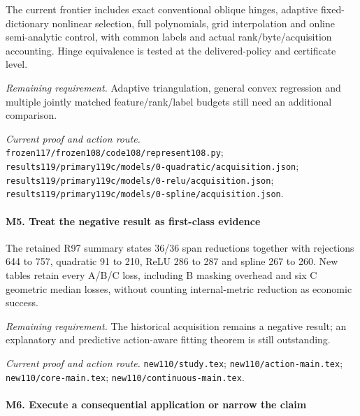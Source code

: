The current frontier includes exact conventional oblique hinges, adaptive fixed-dictionary nonlinear selection, full polynomials, grid interpolation and online semi-analytic control, with common labels and actual rank/\allowbreak{}byte/\allowbreak{}acquisition accounting. Hinge equivalence is tested at the delivered-policy and certificate level.

\par\emph{Remaining requirement.} Adaptive triangulation, general convex regression and multiple jointly matched feature/\allowbreak{}rank/\allowbreak{}label budgets still need an additional comparison.

\par\emph{Current proof and action route.} \nolinkurl{frozen117/frozen108/code108/represent108.py}; \nolinkurl{results119/primary119c/models/0-quadratic/acquisition.json}; \nolinkurl{results119/primary119c/models/0-relu/acquisition.json}; \nolinkurl{results119/primary119c/models/0-spline/acquisition.json}.

\paragraph{M5. Treat the negative result as first-class evidence}

The retained R97 summary states 36/36 span reductions together with rejections 644 to 757, quadratic 91 to 210, ReLU 286 to 287 and spline 267 to 260. New tables retain every A/\allowbreak{}B/\allowbreak{}C loss, including B masking overhead and six C geometric median losses, without counting internal-metric reduction as economic success.

\par\emph{Remaining requirement.} The historical acquisition remains a negative result; an explanatory and predictive action-aware fitting theorem is still outstanding.

\par\emph{Current proof and action route.} \nolinkurl{new110/study.tex}; \nolinkurl{new110/action-main.tex}; \nolinkurl{new110/core-main.tex}; \nolinkurl{new110/continuous-main.tex}.

\paragraph{M6. Execute a consequential application or narrow the claim}

